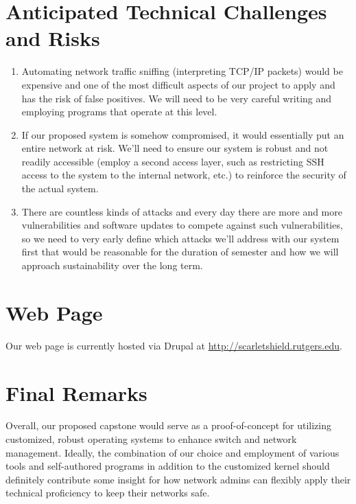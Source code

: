 \section{Anticipated Technical Challenges and Risks}

\begin{enumerate}
\item Automating network traffic sniffing (interpreting TCP/IP packets) would be expensive and one of
the most difficult aspects of our project to apply and has the risk of false positives. We will need to be
very careful writing and employing programs that operate at this level.
\item If our proposed system is somehow compromised, it would essentially put an entire network at
risk. We’ll need to ensure our system is robust and not readily accessible (employ a second access
layer, such as restricting SSH access to the system to the internal network, etc.) to reinforce the
security of the actual system.
\item There are countless kinds of attacks and every day there are more and more vulnerabilities and
software updates to compete against such vulnerabilities, so we need to very early define which
attacks we’ll address with our system first that would be reasonable for the duration of semester and
how we will approach sustainability over the long term.

\end{enumerate}

\section{Web Page}

Our web page is currently hosted via Drupal at \url{http://scarletshield.rutgers.edu}.

\section{Final Remarks}
Overall, our proposed capstone would serve as a proof-of-concept for utilizing customized,
robust operating systems to enhance switch and network management. Ideally, the combination of
our choice and employment of various tools and self-authored programs in addition to the customized
kernel should definitely contribute some insight for how network admins can flexibly apply their
technical proficiency to keep their networks safe.